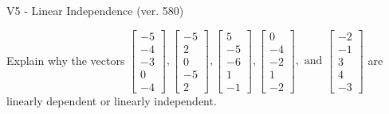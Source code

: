 \begin{exercise}
  \begin{exerciseTitle}V5 - Linear Independence (ver. 580)\end{exerciseTitle}
  \begin{exerciseStatement}
    Explain why the vectors \(\left[\begin{array}{r}
-5 \\
-4 \\
-3 \\
0 \\
-4
\end{array}\right] , \left[\begin{array}{r}
-5 \\
2 \\
0 \\
-5 \\
2
\end{array}\right] , \left[\begin{array}{r}
5 \\
-5 \\
-6 \\
1 \\
-1
\end{array}\right] , \left[\begin{array}{r}
0 \\
-4 \\
-2 \\
1 \\
-2
\end{array}\right] , \text{ and } \left[\begin{array}{r}
-2 \\
-1 \\
3 \\
4 \\
-3
\end{array}\right]\) are linearly dependent or linearly independent.	



\end{exerciseStatement}
\end{exercise}
